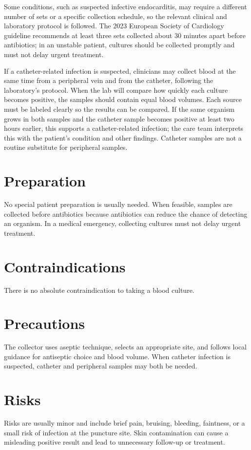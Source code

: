 Some conditions, such as suspected infective endocarditis, may require a different number of sets or a specific collection schedule, so the relevant clinical and laboratory protocol is followed. The 2023 European Society of Cardiology guideline recommends at least three sets collected about 30 minutes apart before antibiotics; in an unstable patient, cultures should be collected promptly and must not delay urgent treatment.

If a catheter-related infection is suspected, clinicians may collect blood at the same time from a peripheral vein and from the catheter, following the laboratory's protocol. When the lab will compare how quickly each culture becomes positive, the samples should contain equal blood volumes. Each source must be labeled clearly so the results can be compared. If the same organism grows in both samples and the catheter sample becomes positive at least two hours earlier, this supports a catheter-related infection; the care team interprets this with the patient's condition and other findings. Catheter samples are not a routine substitute for peripheral samples.

\section*{Preparation}
No special patient preparation is usually needed. When feasible, samples are collected before antibiotics because antibiotics can reduce the chance of detecting an organism. In a medical emergency, collecting cultures must not delay urgent treatment.

\section*{Contraindications}
There is no absolute contraindication to taking a blood culture.

\section*{Precautions}
The collector uses aseptic technique, selects an appropriate site, and follows local guidance for antiseptic choice and blood volume. When catheter infection is suspected, catheter and peripheral samples may both be needed.

\section*{Risks}
Risks are usually minor and include brief pain, bruising, bleeding, faintness, or a small risk of infection at the puncture site. Skin contamination can cause a misleading positive result and lead to unnecessary follow-up or treatment.

